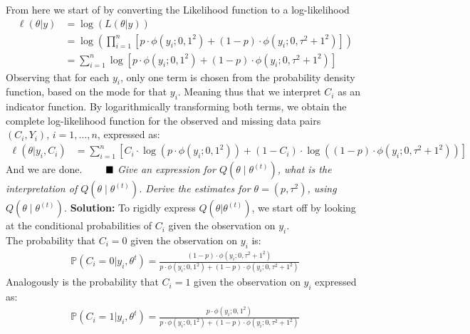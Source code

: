 From here we start of by converting the Likelihood function to a log-likelihood 
\begin{align}
    \ell(\theta|y) &= \log\left(L(\theta|y) \right) \\[5pt]
    &= \log \left(\prod_{i=1}^{n} \left[ p \cdot \phi\left(y_i ; 0,1^2\right)+(1-p) \cdot \phi\left(y_i ; 0, \tau^2+1^2\right) \right] \right) \\[5pt]
    &= \sum_{i=1}^{n} \log \left[ p \cdot \phi\left(y_i ; 0,1^2\right)+(1-p) \cdot \phi\left(y_i ; 0, \tau^2+1^2\right) \right]
\end{align}
Observing that for each \(y_i\), only one term is chosen from the probability density function, based on the mode for that \(y_i\). Meaning thus that we interpret \(C_i\) as an indicator function. By logarithmically transforming both terms, we obtain the complete log-likelihood function for the observed and missing data pairs \((C_i, Y_i)\), \(i = 1, \ldots, n\), expressed as: 
\begin{align*}
\ell(\theta | y_i, C_i) &= \sum_{i=1}^{n} \left[ C_i \cdot \log\left(p \cdot \phi\left(y_i ; 0,1^2\right)\right) + (1 - C_i) \cdot \log\left((1-p) \cdot \phi\left(y_i ; 0, \tau^2+1^2\right)\right) \right]
\end{align*}
And we are done. $\Q$
\emph{Give an expression for $Q\left(\theta \mid \theta^{(t)}\right)$, what is the interpretation of $Q\left(\theta \mid \theta^{(t)}\right)$. Derive the estimates for $\theta=\left(p, \tau^2\right)$, using $Q\left(\theta \mid \theta^{(t)}\right)$.} \spaze
\textbf{Solution:} \spaze
To rigidly express $Q\left(\theta | \theta^{(t)}\right)$, we start off by looking at the conditional probabilities of $C_i$ given the observation on $y_i$. \vspace{3mm}\\ 
The probability that $C_i = 0$ given the observation on $y_i$ is: 
\begin{align}
    \mathbb{P}(C_i = 0 | y_i, \theta^{t}) = \frac{(1-p)\cdot \phi\left(y_i ; 0, \tau^2+1^2\right)}{p \cdot \phi\left(y_i ; 0,1^2\right)+(1-p) \cdot \phi\left(y_i ; 0, \tau^2+1^2\right)} 
\end{align}
Analogously is the probability that $C_i = 1$ given the observation on $y_i$ expressed as:
\begin{align}
    \mathbb{P}(C_i = 1 | y_i, \theta^{t}) = \frac{p \cdot \phi\left(y_i ; 0,1^2\right)}{p \cdot \phi\left(y_i ; 0,1^2\right)+(1-p) \cdot \phi\left(y_i ; 0, \tau^2+1^2\right)}
\end{align}
